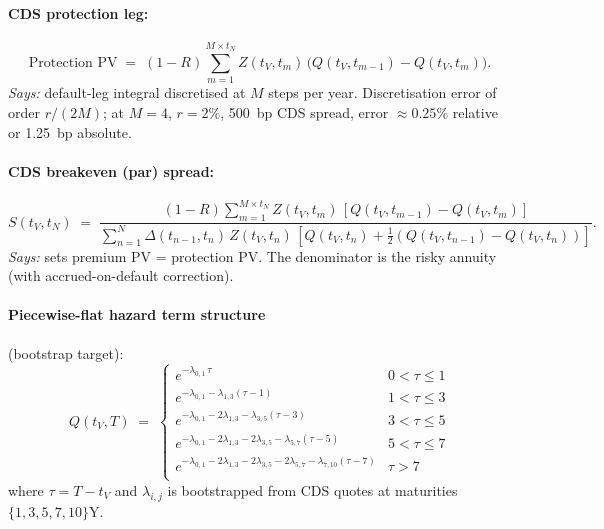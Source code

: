 \documentclass[11pt,a4paper]{article}
\begin{document}
\paragraph{CDS protection leg:}
\begin{equation}\label{eq:cln-cds-prot}
  \text{Protection PV} \;=\; (1 - R) \sum_{m=1}^{M \times t_N} Z(t_V, t_m)\, \bigl( Q(t_V, t_{m-1}) - Q(t_V, t_m) \bigr).
\end{equation}
\textit{Says:} default-leg integral discretised at $M$ steps per year.
Discretisation error of order $r / (2 M)$; at $M = 4$, $r = 2\%$,
500~bp CDS spread, error $\approx 0.25\%$ relative or 1.25~bp absolute.

\paragraph{CDS breakeven (par) spread:}
\begin{equation}\label{eq:cln-cds-par}
  S(t_V, t_N) \;=\; \frac{(1 - R) \sum_{m=1}^{M \times t_N} Z(t_V, t_m)\, [Q(t_V, t_{m-1}) - Q(t_V, t_m)]}
                          {\sum_{n=1}^{N} \Delta(t_{n-1}, t_n)\, Z(t_V, t_n)\, [Q(t_V, t_n) + \frac{1}{2}(Q(t_V, t_{n-1}) - Q(t_V, t_n))]}.
\end{equation}
\textit{Says:} sets premium PV = protection PV. The denominator is
the risky annuity (with accrued-on-default correction).

\paragraph{Piecewise-flat hazard term structure} (bootstrap target):
\begin{equation}\label{eq:cln-hazard-piecewise}
  Q(t_V, T) \;=\;
  \begin{cases}
    e^{-\lambda_{0,1}\, \tau} & 0 < \tau \le 1 \\
    e^{-\lambda_{0,1} - \lambda_{1,3}(\tau - 1)} & 1 < \tau \le 3 \\
    e^{-\lambda_{0,1} - 2\lambda_{1,3} - \lambda_{3,5}(\tau - 3)} & 3 < \tau \le 5 \\
    e^{-\lambda_{0,1} - 2\lambda_{1,3} - 2\lambda_{3,5} - \lambda_{5,7}(\tau - 5)} & 5 < \tau \le 7 \\
    e^{-\lambda_{0,1} - 2\lambda_{1,3} - 2\lambda_{3,5} - 2\lambda_{5,7} - \lambda_{7,10}(\tau - 7)} & \tau > 7 \\
  \end{cases}
\end{equation}
where $\tau = T - t_V$ and $\lambda_{i,j}$ is bootstrapped from CDS
quotes at maturities $\{1, 3, 5, 7, 10\}$Y.
\end{document}
